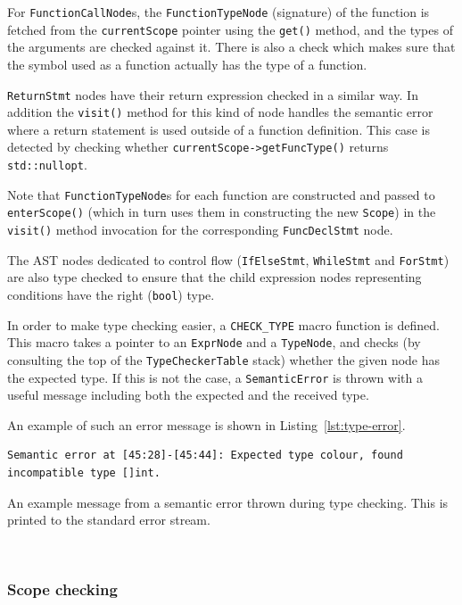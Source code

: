 \documentclass[11pt,a4paper]{scrartcl}
\begin{document}
For \verb|FunctionCallNode|s, the \verb|FunctionTypeNode| (signature) of the function is fetched from the \verb|currentScope| pointer using the \verb|get()| method, and the types of the arguments are checked against it. There is also a check which makes sure that the symbol used as a function actually has the type of a function.

\verb|ReturnStmt| nodes have their return expression checked in a similar way. In addition the \verb|visit()| method for this kind of node handles the semantic error where a return statement is used outside of a function definition. This case is detected by checking whether \verb|currentScope->getFuncType()| returns \verb|std::nullopt|.

Note that \verb|FunctionTypeNode|s for each function are constructed and passed to \verb|enterScope()| (which in turn uses them in constructing the new \verb|Scope|) in the \verb|visit()| method invocation for the corresponding \verb|FuncDeclStmt| node.

The AST nodes dedicated to control flow (\verb|IfElseStmt|, \verb|WhileStmt| and \verb|ForStmt|) are also type checked to ensure that the child expression nodes representing conditions have the right (\verb|bool|) type.

In order to make type checking easier, a \verb|CHECK_TYPE| macro function is defined. This macro takes a pointer to an \verb|ExprNode| and a \verb|TypeNode|, and checks (by consulting the top of the \verb|TypeCheckerTable| stack) whether the given node has the expected type. If this is not the case, a \verb|SemanticError| is thrown with a useful message including both the expected and the received type.

An example of such an error message is shown in Listing~\ref{lst:type-error}.

\begin{lstfloat}

\begin{verbatim}
Semantic error at [45:28]-[45:44]: Expected type colour, found incompatible type []int.
\end{verbatim}

  \caption{An example message from a semantic error thrown during type checking. This is printed to the standard error stream.}~\label{lst:type-error}
\end{lstfloat}

\subsubsection{Scope checking}
\end{document}
